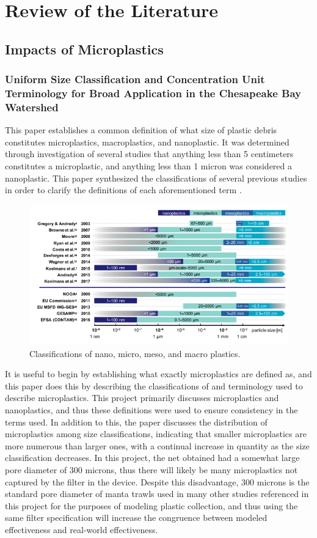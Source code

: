 \documentclass[fleqn,10pt]{SelfArx} %
\begin{document}
	\section{Review of the Literature}
	\subsection{Impacts of Microplastics}
	\subsubsection*{Uniform Size Classification and Concentration Unit Terminology for Broad Application in the Chesapeake Bay Watershed}
	This paper establishes a common definition of what size of plastic debris constitutes microplastics, macroplastics, and nanoplastic. It was determined through investigation of several studies  that anything less than 5 centimeters constitutes a microplastic, and anything less than 1 micron was considered a nanoplastic. This paper synthesized the classifications of several previous studies in order to clarify the definitions of each aforementioned term \cite{TetraTech}.
	\begin{figure}[h]
		\centering
		\includegraphics[width=\linewidth]{Figures/TetraTech.png}
		\caption[MP Size Classes]{Classifications of nano, micro, meso, and macro plastics.}
		\label{fig:TetraTech}
	\end{figure}
	It is useful to begin by establishing what exactly microplastics are defined as, and this paper does this by describing the classifications of and terminology used to describe microplastics. This project primarily discusses microplastics and nanoplastics, and thus these definitions were used to ensure consistency in the terms used. In addition to this, the paper discusses the distribution of microplastics among size classifications, indicating that smaller microplastics are more numerous than larger ones, with a continual increase in quantity as the size classification decreases. In this project, the net obtained had a somewhat large pore diameter of 300 microns, thus there will likely be many microplastics not captured by the filter in the device. Despite this disadvantage, 300 microns is the standard pore diameter of manta trawls used in many other studies referenced in this project for the purposes of modeling plastic collection, and thus using the same filter specification will increase the congruence between modeled effectiveness and real-world effectiveness.
\end{document}
